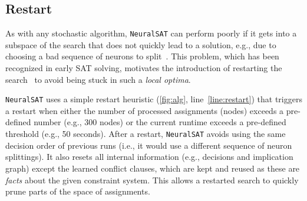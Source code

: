 \documentclass[oneside,11pt,dvipsnames]{book}
\numberwithin{equation}{section}
\theoremstyle{definition}
\theoremstyle{remark}
\newcommand{\tvn}[1]{\iftoggle{usecomment}{{\color{red}{[TVN]: #1}}}{}}
\newcommand{\hd}[1]{\iftoggle{usecomment}{{\color{blue}{[HD]: #1}}}{}}
\newcommand{\tool}{\texttt{NeuralSAT}}
\begin{document}
\subsection{Restart}\label{sec:restart}


As with any stochastic algorithm, \tool{} can perform poorly if it gets into a subspace of the search that does not quickly lead to a solution, e.g., due to choosing a bad sequence of neurons to split~\cite{bunel2018unified,de2021improved}.
This problem, which has been recognized in early SAT solving, motivates the introduction of restarting the search~\cite{gomes1998boosting} to avoid being stuck in such a \emph{local optima}.






\tool{} uses a simple restart heuristic (\autoref{fig:alg}, line~\ref{line:restart}) that triggers a restart when either the number of processed assignments (nodes) exceeds a pre-defined number (e.g., 300 nodes) or the current runtime exceeds a pre-defined threshold (e.g., 50 seconds).
After a restart, \tool{} avoids using the same decision order of previous runs (i.e., it would use a different sequence of neuron splittings). It also resets all internal information (e.g., decisions and implication graph) except the learned conflict clauses, which are kept and reused as these are \textit{facts} about the given constraint system.
This allows a restarted search to quickly prune parts of the  space of assignments.


\end{document}
